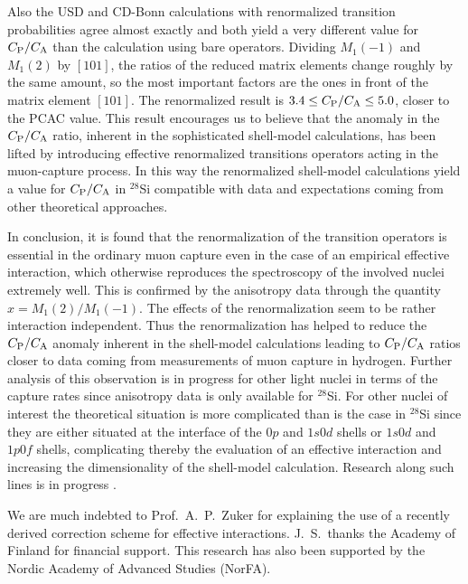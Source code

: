 \begin{multicols}{2}
Also the USD and CD-Bonn calculations with renormalized transition
probabilities agree almost exactly and both yield a very different value for
$C_{\rm P}/C_{\rm A}$ than the calculation using bare operators.
Dividing $M_1(-1)$ and $M_1(2)$ by $[101]$, the ratios of the reduced matrix
elements change roughly
by the same amount, so the most important factors are the ones in front of
the matrix element $[101]$.
The renormalized result is $3.4\le C_{\rm P}/C_{\rm A}\le 5.0$,
closer to the PCAC value.
This result
encourages us to believe that the anomaly in the $C_{\rm P}/C_{\rm A}$ ratio,
inherent in the sophisticated shell-model calculations, has been lifted
by introducing effective renormalized transitions operators acting in
the muon-capture process. In this way the renormalized shell-model
calculations yield a value for $C_{\rm P}/C_{\rm A}$ in $^{28}$Si
compatible with data and expectations coming from other theoretical
approaches.

In conclusion, it is found that the renormalization of the transition
operators is essential in the ordinary muon capture
even in the case of an empirical effective interaction, which otherwise
reproduces the spectroscopy of the involved nuclei extremely well. This is
confirmed by the anisotropy data
through the quantity $x=M_1(2)/M_1(-1)$. The effects of the renormalization
seem to be rather interaction independent. Thus the renormalization has helped
to reduce the $C_{\rm P}/C_{\rm A}$ anomaly inherent in the shell-model
calculations leading to $C_{\rm P}/C_{\rm A}$ ratios closer to data coming
from measurements of muon capture in hydrogen.
Further analysis of this observation is in progress for other light
nuclei in terms of the capture rates since anisotropy data is only
available for $^{28}$Si. For other nuclei of interest the
theoretical situation is more complicated than is the case in
$^{28}$Si since they are either situated at the interface of the $0p$ and
$1s0d$ shells or $1s0d$ and $1p0f$ shells, complicating thereby the evaluation
of an effective interaction and increasing the dimensionality
of the shell-model calculation. Research along such lines is
in progress \cite{ssh98}.\newline

We are much indebted to Prof.\
A.\ P.\ Zuker for explaining the use of a recently derived
correction scheme for effective interactions.
J.\ S.\ thanks the Academy of
Finland for financial support.
This research has also been supported by
the Nordic Academy of Advanced Studies (NorFA).


\end{multicols}

